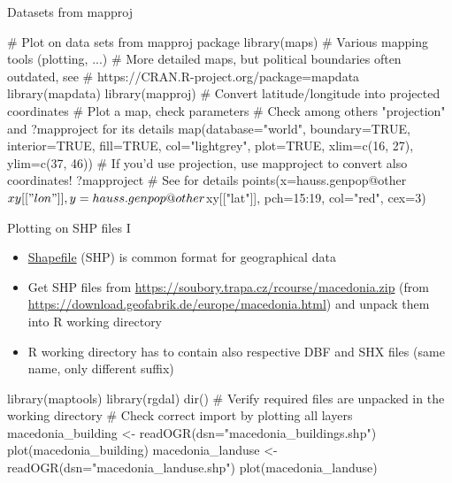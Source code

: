 \documentclass[compress, ucs, xelatex, 11pt, xcolor=svgnames, aspectratio=169,
	hyperref={
		bookmarks=true,
		unicode=true,
		colorlinks=true,
		pdftitle={Molecular data in R},
		plainpages=false,
		pdfauthor={Vojtech Zeisek},
		pdfsubject={Course about phylogeny and evolution in R},
		pdfcreator={XeLaTeX},
		pdfkeywords={R, evolution, phylogeny, molecular data},
		linkcolor=Crimson, %
		anchorcolor=Magenta, %
		citecolor=Magenta, %
		filecolor=Magenta, %
		menucolor=Magenta, %
		urlcolor=DodgerBlue, %
		pdftex},
	url={hyphens, lowtilde} %
	]{beamer}
\begin{document}
\begin{frame}[fragile]{Datasets from mapproj}
	\begin{spluscode}
    # Plot on data sets from mapproj package
    library(maps) # Various mapping tools (plotting, ...)
    # More detailed maps, but political boundaries often outdated, see
    # https://CRAN.R-project.org/package=mapdata
    library(mapdata)
    library(mapproj)
    # Convert latitude/longitude into projected coordinates
    # Plot a map, check parameters
    # Check among others "projection" and ?mapproject for its details
    map(database="world", boundary=TRUE, interior=TRUE, fill=TRUE,
      col="lightgrey", plot=TRUE, xlim=c(16, 27), ylim=c(37, 46))
    # If you'd use projection, use mapproject to convert also coordinates!
    ?mapproject # See for details
    points(x=hauss.genpop@other$xy[["lon"]], y=hauss.genpop@other$xy[["lat"]],
      pch=15:19, col="red", cex=3)
	\end{spluscode}
\end{frame}

\begin{frame}[fragile]{Plotting on SHP files I}
	\begin{itemize}
		\item \href{https://en.wikipedia.org/wiki/Shapefile}{Shapefile} (SHP) is common format for geographical data
		\item Get SHP files from \url{https://soubory.trapa.cz/rcourse/macedonia.zip} (from \url{https://download.geofabrik.de/europe/macedonia.html}) and unpack them into R working directory
		\item R working directory has to contain also respective DBF and SHX files (same name, only different suffix)
	\end{itemize}
	\begin{spluscode}
    library(maptools)
    library(rgdal)
    dir() # Verify required files are unpacked in the working directory
    # Check correct import by plotting all layers
    macedonia_building <- readOGR(dsn="macedonia_buildings.shp")
    plot(macedonia_building)
    macedonia_landuse <- readOGR(dsn="macedonia_landuse.shp")
    plot(macedonia_landuse)
	\end{spluscode}
\end{frame}
\end{document}
